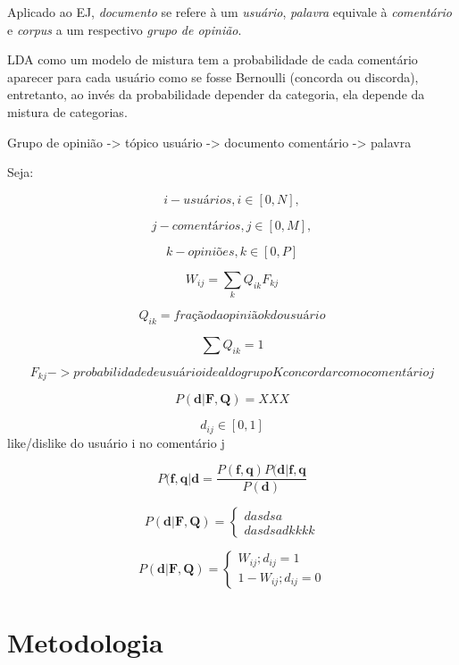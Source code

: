 Aplicado ao EJ, \textit{documento} se refere à um \textit{usuário}, \textit{palavra} equivale à \textit{comentário} e \textit{corpus} a um respectivo \textit{grupo de opinião}.

LDA como um modelo de mistura tem a probabilidade de cada comentário aparecer para cada usuário como se fosse Bernoulli (concorda ou discorda), entretanto, ao invés da probabilidade depender da categoria, ela depende da mistura de categorias.

Grupo de opinião -> tópico
usuário -> documento
comentário -> palavra

Seja:

$$ i - usuários, i \in [0,N],$$

$$ j - comentários, j \in [0,M],$$

$$ k - opiniões, k \in [0,P] $$

$$ W_{ij} = \sum_{k} Q_{ik} F_{kj} $$

$$ Q_{ik} = fração da opinião k do usuário $$

$$ \sum Q_{ik} = 1 $$

$$ F_{kj} -> probabilidade de usuário ideal do grupo K concordar com o comentário j $$


$$ P(\textbf{d}|\textbf{F}, \textbf{Q})=XXX $$

$$ d_{ij} \in [0,1] $$ 
like/dislike do usuário i no comentário j


$$ P(\textbf{f}, \textbf{q} | \textbf{d} = \frac {P(\textbf{f},\textbf{q}) P(\textbf{d}| \textbf{f}, \textbf{q}} {P(\textbf{d})} $$


\begin{equation}
P(\textbf{d}|\textbf{F}, \textbf{Q})= 
\begin{cases}
  dasdsa \\
  dasdsadkkkk
\end{cases}
\end{equation}

\[ P(\textbf{d}|\textbf{F}, \textbf{Q})= 
  \begin{cases}
     W_{ij} ; d_{ij} = 1  \\
     1-W_{ij} ; d_{ij} = 0
  \end{cases}
\]





\chapter{Metodologia}


